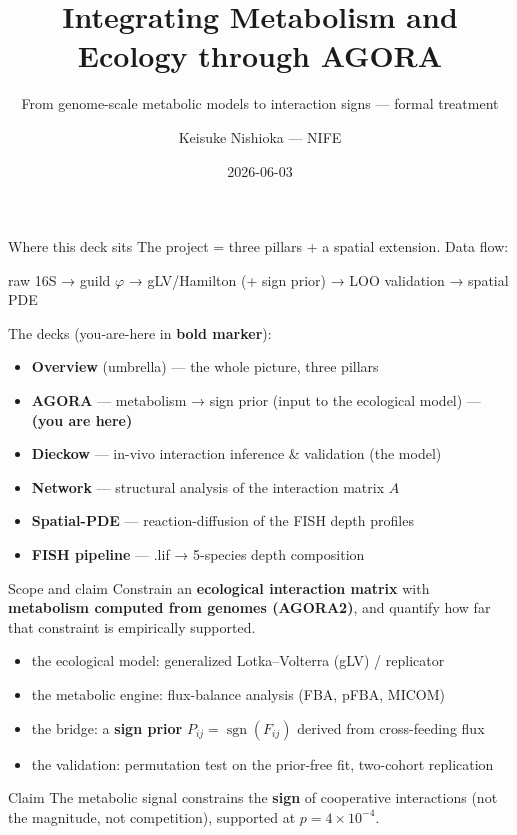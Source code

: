 \documentclass[
  ignorenonframetext,
  aspectratio=169,
]{beamer}
\title{Integrating Metabolism and Ecology through AGORA}
\subtitle{From genome-scale metabolic models to interaction signs ---
formal treatment}
\author{Keisuke Nishioka --- NIFE}
\date{2026-06-03}
\providecommand{\tightlist}{%
  \setlength{\itemsep}{0pt}\setlength{\parskip}{0pt}}
\begin{document}
\frame{\titlepage}

\begin{frame}{Where this deck sits}
\protect\hypertarget{where-this-deck-sits}{}
The project = three pillars + a spatial extension. Data flow:

raw 16S → guild \(\varphi\) → gLV/Hamilton (+ sign prior) → LOO
validation → spatial PDE

The decks (you-are-here in \textbf{bold marker}):

\begin{itemize}
\tightlist
\item
  \textbf{Overview} (umbrella) --- the whole picture, three pillars
\item
  \textbf{AGORA} --- metabolism → sign prior (input to the ecological
  model) --- \textbf{(you are here)}
\item
  \textbf{Dieckow} --- in-vivo interaction inference \& validation (the
  model)
\item
  \textbf{Network} --- structural analysis of the interaction matrix
  \(A\)
\item
  \textbf{Spatial-PDE} --- reaction-diffusion of the FISH depth profiles
\item
  \textbf{FISH pipeline} --- .lif → 5-species depth composition
\end{itemize}
\end{frame}

\begin{frame}{Scope and claim}
\protect\hypertarget{scope-and-claim}{}
Constrain an \textbf{ecological interaction matrix} with
\textbf{metabolism computed from genomes (AGORA2)}, and quantify how far
that constraint is empirically supported.

\begin{itemize}
\tightlist
\item
  the ecological model: generalized Lotka--Volterra (gLV) / replicator
\item
  the metabolic engine: flux-balance analysis (FBA, pFBA, MICOM)
\item
  the bridge: a \textbf{sign prior}
  \(P_{ij}=\operatorname{sgn}(F_{ij})\) derived from cross-feeding flux
\item
  the validation: permutation test on the prior-free fit, two-cohort
  replication
\end{itemize}

\vspace{0.4em}

\begin{block}{Claim}
The metabolic signal constrains the \textbf{sign} of cooperative
interactions (not the magnitude, not competition), supported at
\alert{$p=4\times10^{-4}$}.
\end{block}
\end{frame}
\end{document}
